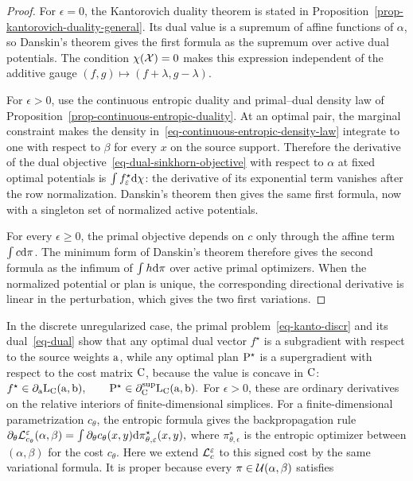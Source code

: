 \begin{proof}
For $\epsilon=0$, the Kantorovich duality theorem is stated in Proposition~\ref{prop-kantorovich-duality-general}. Its dual value is a supremum of affine functions of $\alpha$, so Danskin's theorem gives the first formula as the supremum over active dual potentials. The condition $\chi(\Xx)=0$ makes this expression independent of the additive gauge $(f,g)\mapsto(f+\lambda,g-\lambda)$.

For $\epsilon>0$, use the continuous entropic duality and primal--dual density law of Proposition~\ref{prop-continuous-entropic-duality}. At an optimal pair, the marginal constraint makes the density in~\eqref{eq-continuous-entropic-density-law} integrate to one with respect to $\beta$ for every $x$ on the source support. Therefore the derivative of the dual objective~\eqref{eq-dual-sinkhorn-objective} with respect to $\alpha$ at fixed optimal potentials is $\int f_\epsilon^\star\d\chi$: the derivative of its exponential term vanishes after the row normalization. Danskin's theorem then gives the same first formula, now with a singleton set of normalized active potentials.

For every $\epsilon\geq0$, the primal objective depends on $c$ only through the affine term $\int c\d\pi$. The minimum form of Danskin's theorem therefore gives the second formula as the infimum of $\int h\d\pi$ over active primal optimizers. When the normalized potential or plan is unique, the corresponding directional derivative is linear in the perturbation, which gives the two first variations.
\end{proof}
In the discrete unregularized case, the primal problem~\eqref{eq-kanto-discr} and its dual~\eqref{eq-dual} show that any optimal dual vector $f^\star$ is a subgradient with respect to the source weights $\a$, while any optimal plan $\P^\star$ is a supergradient with respect to the cost matrix $\C$, because the value is concave in $\C$:
\(f^\star\in\partial_{\a}\MKD_{\C}(\a,\b), \qquad \P^\star\in\partial_{\C}^{\mathrm{sup}}\MKD_{\C}(\a,\b).\)
For $\epsilon>0$, these are ordinary derivatives on the relative interiors of finite-dimensional simplices. For a finite-dimensional parametrization $c_\theta$, the entropic formula gives the backpropagation rule
\(\partial_{\theta}\MK_{c_\theta}^\epsilon(\alpha,\beta) = \int \partial_\theta c_\theta(x,y)\d\pi_{\theta,\epsilon}^\star(x,y),\)
where $\pi_{\theta,\epsilon}^\star$ is the entropic optimizer between $(\alpha,\beta)$ for the cost $c_\theta$. Here we extend $\MK_c^\epsilon$ to this signed cost by the same variational formula. It is proper because every $\pi\in\Couplings(\alpha,\beta)$ satisfies
